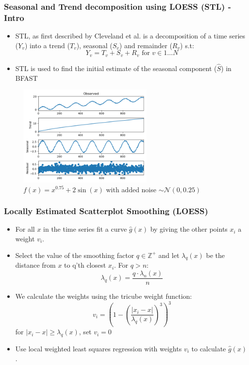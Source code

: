 \documentclass[presentation.tex]{subfiles}
\begin{document}
\begin{frame}
\frametitle{Seasonal and Trend decomposition using LOESS (STL) - Intro}
\begin{itemize}
\item STL, as first described by Cleveland et al. is a decomposition of a time
  series ($Y_v$) into a trend ($T_v$), seasonal ($S_v$) and remainder
  ($R_v$) s.t:
  \[
  Y_v = T_v + S_v + R_v \text{ for } v \in 1 \hdots N
  \]
\item STL is used to find the initial estimate of the seasonal component ($\hat{S}$) in BFAST
\end{itemize}
  \begin{figure}[H]
    \centering
    \includegraphics[width=0.6\textwidth]{imgs/stl1.png}
    \caption{$f(x) = x^{0.75} + 2\sin(x)$ with added noise
      $\sim \mathcal{N}(0, 0.25)$}
  \end{figure}
  \centering
\end{frame}


\begin{frame}
\frametitle{Locally Estimated Scatterplot Smoothing (LOESS)}
\begin{itemize}
  \item For all $x$ in the time series fit a curve $\hat{g}(x)$ by giving the
    other points $x_i$ a weight $v_i$.
\item Select the value of the smoothing factor $q \in \mathbb{Z}^+$ and let
  $\lambda_q(x)$ be the distance from $x$ to q'th closest $x_i$. For $q > n$:
  \[
  \lambda_q(x) = \frac{q \cdot \lambda_n(x)}{n}
  \]
\item We calculate the weights using the tricube weight function:
  \[
  v_i = \left( 1 - \left( \frac{| x_i - x |}{\lambda_q(x)}  \right)^3\right)^3
  \]
  for $| x_i - x | \geq \lambda_q(x)$, set $v_i = 0$
\item Use local weighted least squares regression with weights
  $v_i$ to calculate $\hat{g}(x)$.
\end{itemize}
\end{frame}
\end{document}
